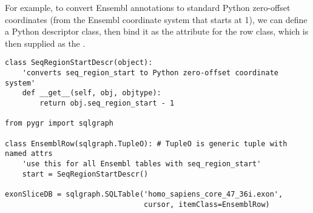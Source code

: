 \documentclass{howto}
\begin{document}
For example, to convert Ensembl annotations to standard Python zero-offset
coordinates (from the Ensembl coordinate system that starts at 1), we
can define a Python descriptor class, then bind it as the 
attribute for the row class, which is then supplied as the .
\begin{verbatim}
class SeqRegionStartDescr(object):
    'converts seq_region_start to Python zero-offset coordinate system'
    def __get__(self, obj, objtype):
        return obj.seq_region_start - 1

from pygr import sqlgraph

class EnsemblRow(sqlgraph.TupleO): # TupleO is generic tuple with named attrs
    'use this for all Ensembl tables with seq_region_start'
    start = SeqRegionStartDescr()

exonSliceDB = sqlgraph.SQLTable('homo_sapiens_core_47_36i.exon',
                                cursor, itemClass=EnsemblRow)
\end{verbatim}
\end{document}
